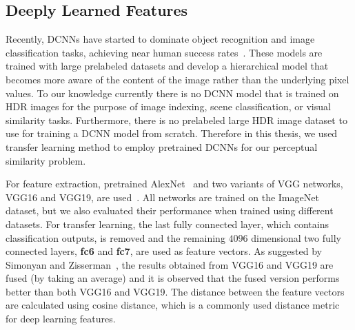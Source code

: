 \subsection{Deeply Learned Features}
Recently, DCNNs have started to dominate object recognition and image classification tasks, achieving near human success rates~\cite{krizhevsky2012imagenet,simonyan2014very,zhou2017scene}. These models are trained with large prelabeled datasets and develop a hierarchical model that becomes more aware of the content of the image rather than the underlying pixel values. To our knowledge currently there is no DCNN model that is trained on HDR images for the purpose of image indexing, scene classification, or visual similarity tasks.
Furthermore, there is no prelabeled large HDR image dataset to use for training a DCNN model from scratch. Therefore in this thesis, we used transfer learning method to employ pretrained DCNNs for our perceptual similarity problem. 

For feature extraction, pretrained AlexNet~\cite{krizhevsky2012imagenet} and two variants of VGG networks, VGG16 and VGG19, are used~\cite{simonyan2014very}. All networks are trained on the ImageNet~\cite{russakovsky2015imagenet} dataset, but we also evaluated their performance when trained using different datasets. For transfer learning, the last fully connected layer, which contains classification outputs, is removed and the remaining $4096$ dimensional two fully connected layers, \textbf{fc6} and \textbf{fc7}, are used as feature vectors. As suggested by Simonyan and Zisserman~\cite{simonyan2014very}, the results obtained from VGG16 and VGG19 are fused (by taking an average) and it is observed that the fused version performs better than both VGG16 and VGG19. The distance between the feature vectors are calculated using cosine distance, which is a commonly used distance metric for deep learning features. 

